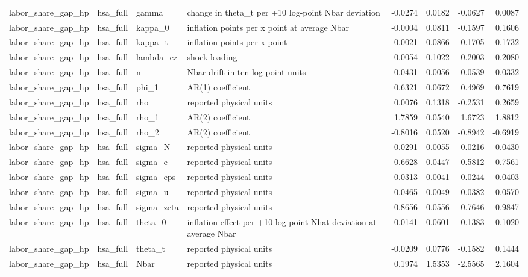 \begin{tabular}{llllrrrr}
labor\_share\_gap\_hp & hsa\_full & gamma & change in theta\_t per +10 log-point Nbar deviation & -0.0274 & 0.0182 & -0.0627 & 0.0087 \\
labor\_share\_gap\_hp & hsa\_full & kappa\_0 & inflation points per x point at average Nbar & -0.0004 & 0.0811 & -0.1597 & 0.1606 \\
labor\_share\_gap\_hp & hsa\_full & kappa\_t & inflation points per x point & 0.0021 & 0.0866 & -0.1705 & 0.1732 \\
labor\_share\_gap\_hp & hsa\_full & lambda\_ez & shock loading & 0.0054 & 0.1022 & -0.2003 & 0.2080 \\
labor\_share\_gap\_hp & hsa\_full & n & Nbar drift in ten-log-point units & -0.0431 & 0.0056 & -0.0539 & -0.0332 \\
labor\_share\_gap\_hp & hsa\_full & phi\_1 & AR(1) coefficient & 0.6321 & 0.0672 & 0.4969 & 0.7619 \\
labor\_share\_gap\_hp & hsa\_full & rho & reported physical units & 0.0076 & 0.1318 & -0.2531 & 0.2659 \\
labor\_share\_gap\_hp & hsa\_full & rho\_1 & AR(2) coefficient & 1.7859 & 0.0540 & 1.6723 & 1.8812 \\
labor\_share\_gap\_hp & hsa\_full & rho\_2 & AR(2) coefficient & -0.8016 & 0.0520 & -0.8942 & -0.6919 \\
labor\_share\_gap\_hp & hsa\_full & sigma\_N & reported physical units & 0.0291 & 0.0055 & 0.0216 & 0.0430 \\
labor\_share\_gap\_hp & hsa\_full & sigma\_e & reported physical units & 0.6628 & 0.0447 & 0.5812 & 0.7561 \\
labor\_share\_gap\_hp & hsa\_full & sigma\_eps & reported physical units & 0.0313 & 0.0041 & 0.0244 & 0.0403 \\
labor\_share\_gap\_hp & hsa\_full & sigma\_u & reported physical units & 0.0465 & 0.0049 & 0.0382 & 0.0570 \\
labor\_share\_gap\_hp & hsa\_full & sigma\_zeta & reported physical units & 0.8656 & 0.0556 & 0.7646 & 0.9847 \\
labor\_share\_gap\_hp & hsa\_full & theta\_0 & inflation effect per +10 log-point Nhat deviation at average Nbar & -0.0141 & 0.0601 & -0.1383 & 0.1020 \\
labor\_share\_gap\_hp & hsa\_full & theta\_t & reported physical units & -0.0209 & 0.0776 & -0.1582 & 0.1444 \\
labor\_share\_gap\_hp & hsa\_full & Nbar & reported physical units & 0.1974 & 1.5353 & -2.5565 & 2.1604 \\

\end{tabular}
